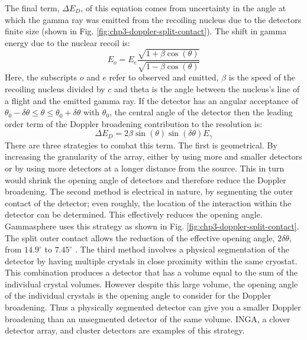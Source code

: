 The final term, $\Delta{}E_{D}$, of this equation comes from uncertainty in the angle at which the gamma ray was emitted from the recoiling nucleus due to the detectors finite size (shown in Fig. \ref{fig:chp3-doppler-split-contact}). The shift in gamma energy due to the nuclear recoil is:
\begin{equation}
\label{eqn:chp3-doppler_formula} 
E_{o} = E_{e}\frac{\sqrt{1+\beta{}\cos(\theta)}}{\sqrt{1-\beta{}\cos(\theta)}}
\end{equation}
Here, the subscripts $o$ and $e$ refer to observed and emitted, $\beta$ is the speed of the recoiling nucleus divided by $c$ and theta is the angle between the nucleus's line of a flight and the emitted gamma ray. If the detector has an angular acceptance of $\theta{}_{0}-\delta{}\theta{}\leq{}\theta{}\leq{}\theta{}_{0}+\delta{}\theta{}$ with $\theta{}_{0}$, the central angle of the detector then the leading order term of the Doppler broadening contribution to the resolution is:
\begin{equation}
\label{eqn:chp3-res-doppler-term} 
\Delta{}E_{D} = 2\beta{}\sin(\theta{})\sin(\delta{}\theta{})E_{\gamma}
\end{equation}
There are three strategies to combat this term. The first is geometrical. By increasing the granularity of the array, either by using more and smaller detectors or by using more detectors at a longer distance from the source. This in turn would shrink the opening angle of detectors and therefore reduce the Doppler broadening. The second method is electrical in nature, by segmenting the outer contact of the detector; even roughly, the location of the interaction within the detector can be determined. This effectively reduces the opening angle. Gammasphere uses this strategy as shown in Fig. \ref{fig:chp3-doppler-split-contact}. The split outer contact allows the reduction of the effective opening angle, $2\delta{}\theta{}$, from $14.9^{\circ}$ to $7.45^{\circ}$ \cite{TheGS}. The third method involves a physical segmentation of the detector by having multiple crystals in close proximity within the same cryostat. This combination produces a detector that has a volume equal to the sum of the individual crystal volumes. However despite this large volume, the opening angle of the individual crystals is the opening angle to consider for the Doppler broadening. Thus a physically segmented detector can give you a smaller Doppler broadening than an unsegmented detector of the same volume.  INGA, a clover detector array, and cluster detectors\cite{clusterDetector,cloverDet,ingaAtIUAC} are examples of this strategy.

